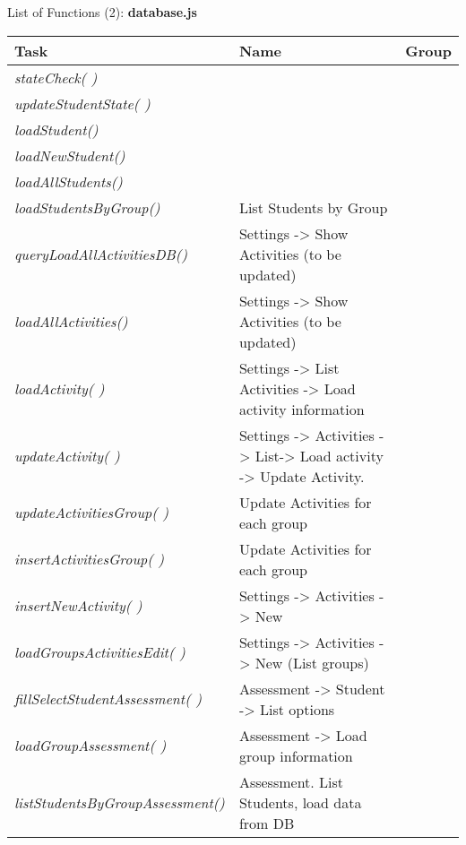 \newpage


\begin{bclogo}[couleur=orange!30,logo=\bcbook, arrondi=0.1,ombre=true ] 
{List of Functions (2): {\bf database.js}}	
\begin{tabular}{lll}
Task                    & Name            & Group \\
\hline



\emph { stateCheck( )}                  &{ }\\
\emph { updateStudentState( )}          &{ } \\
\emph { loadStudent()      }             &{ } \\
\emph { loadNewStudent()   }             & { } \\
\emph { loadAllStudents()  }             & { }\\
\emph { loadStudentsByGroup()}          & { List Students by Group } \\
\emph { queryLoadAllActivitiesDB()}     & { Settings -> Show Activities (to be updated) } \\
\emph { loadAllActivities() }           &{ Settings -> Show Activities (to be updated) } \\
\emph { loadActivity( )}                & {Settings -> List Activities -> Load activity information } \\
\emph { updateActivity(  )}             &{Settings -> Activities -> List-> Load activity -> Update Activity. }\\
\emph { updateActivitiesGroup( )}       &{ Update Activities for each group }\\
\emph { insertActivitiesGroup( )}       & { Update Activities for each group } \\
\emph {  insertNewActivity(  ) }        & {Settings -> Activities -> New }\\
\emph { loadGroupsActivitiesEdit( )}    & {Settings -> Activities -> New (List groups) } \\
\emph { fillSelectStudentAssessment( )}  & { Assessment -> Student -> List options  }\\
\emph { loadGroupAssessment(  ) }       & { Assessment -> Load group information } \\
\emph { listStudentsByGroupAssessment()} & {  Assessment. List Students, load data  from DB } \\

\end{tabular}
\end{bclogo}
